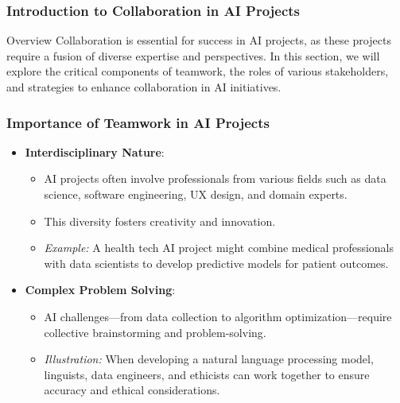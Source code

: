 \documentclass[aspectratio=169]{beamer}
\begin{document}
\frame{\titlepage}

\begin{frame}[fragile]
    \maketitle
\end{frame}

\begin{frame}[fragile]
    \frametitle{Introduction to Collaboration in AI Projects}
    \begin{block}{Overview}
        Collaboration is essential for success in AI projects, as these projects require a fusion of diverse expertise and perspectives. 
        In this section, we will explore the critical components of teamwork, the roles of various stakeholders, and strategies to enhance collaboration in AI initiatives.
    \end{block}
\end{frame}

\begin{frame}[fragile]
    \frametitle{Importance of Teamwork in AI Projects}
    \begin{itemize}
        \item \textbf{Interdisciplinary Nature}:
        \begin{itemize}
            \item AI projects often involve professionals from various fields such as data science, software engineering, UX design, and domain experts.
            \item This diversity fosters creativity and innovation.
            \item \textit{Example:} A health tech AI project might combine medical professionals with data scientists to develop predictive models for patient outcomes.
        \end{itemize}
        
        \item \textbf{Complex Problem Solving}:
        \begin{itemize}
            \item AI challenges—from data collection to algorithm optimization—require collective brainstorming and problem-solving. 
            \item \textit{Illustration:} When developing a natural language processing model, linguists, data engineers, and ethicists can work together to ensure accuracy and ethical considerations.
        \end{itemize}
    \end{itemize}
\end{frame}
\end{document}
